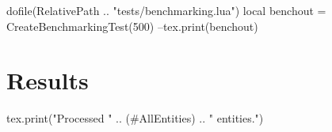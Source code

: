 \documentclass[oneside]{memoir}
\begin{document}
\pagestyle{empty}

\begin{luacode*}
	dofile(RelativePath .. "tests/benchmarking.lua")
	local benchout = CreateBenchmarkingTest(500)
	--tex.print(benchout)
\end{luacode*}

\chapter*{Results}

\begin{luacode*}
	tex.print("Processed " .. (#AllEntities) .. " entities.")
\end{luacode*}

\PrintRpgTexErrors

\PrintRpgTexBenchmarking
\end{document}

